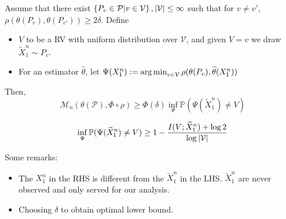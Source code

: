 \documentclass[10pt,xcolor={usenames,dvipsnames,table},aspectratio=169]{beamer}
\begin{document}
\begin{frame}
    \begin{theorem}
        Assume that there exist $\left\{P_v \in \mathcal{P}| v\in \mathcal{V}\right\}, \left\lvert\mathcal{V}\right\rvert \leq \infty$ such that for $v \neq v'$,  $\rho(\theta(P_v), \theta(P_{v'})) \geq 2\delta$.
        Define
        \begin{itemize}
            \item $V$ to be a RV with uniform distribution over  $\mathcal{V}$, and given $V=v$ we draw $\widetilde{X}_1^{n} \sim P_v$.
            \item For an estimator $\widehat{\theta}$, let $\Psi(X_1^{n}) := \operatorname*{arg\,min}_{v \in \mathcal{V}} \rho(\theta(P_v), \widehat{\theta}(X_1^{n}))$
        \end{itemize}
        Then,
        \[
        \mathcal{M}_n(\theta(\mathcal{P}), \Phi \circ \rho) \geq \Phi(\delta) \inf_{\Psi} \mathbb{P}(\Psi(\widetilde{X}_1^{n}) \neq V)
        \] 
    \end{theorem}
    \begin{lemma}
        \[
        \inf_{\Psi} \mathbb{P}(\Psi(\widetilde{X}_1^{n}) \neq V) \geq 1-\dfrac{I(V; \widetilde{X}_1^{n}) + \log 2}{\log \left\lvert\mathcal{V}\right\rvert}
        \] 
    \end{lemma}
    Some remarks:
    \begin{itemize}
        \item The $X_1^{n}$ in the RHS is different from the $\widetilde{X}_1^{n}$ in the LHS. $\widetilde{X}_1^{n}$ are never observed and only served for our analysis.
        \item Choosing $\delta$ to obtain optimal lower bound. 
    \end{itemize}
\end{frame}
\end{document}
